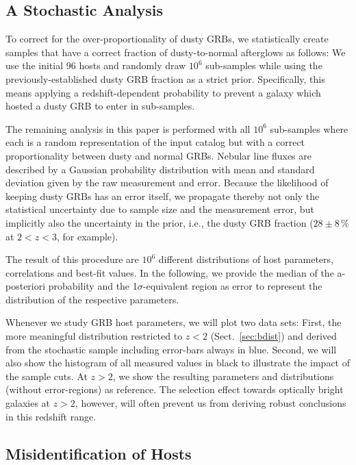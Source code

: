 \documentclass[traditabstract, longauth]{aa}
\begin{document}
\subsection{A Stochastic Analysis}
\label{sec:statana}

 {To correct for the over-proportionality of dusty GRBs, we statistically create samples that have a correct fraction of dusty-to-normal afterglows as follows: We use the initial 96 hosts and randomly draw $10^6$ sub-samples while using the previously-established dusty GRB fraction as a strict prior. Specifically, this means applying a redshift-dependent probability to prevent a galaxy which hosted a dusty GRB to enter in sub-samples.}
 
 {The remaining analysis in this paper is performed with all $10^{6}$ sub-samples where each is a random representation of the input catalog but with a correct proportionality between dusty and normal GRBs. Nebular line fluxes are described by a Gaussian probability distribution with mean and standard deviation given by the raw measurement and error. Because the likelihood of keeping dusty GRBs has an error itself, we propagate thereby not only the statistical uncertainty due to sample size and the measurement error, but implicitly also the uncertainty in the prior, i.e., the dusty GRB fraction ($28\pm8\,\%$ at $2<z<3$, for example).}

 {The result of this procedure are $10^{6}$ different distributions of host parameters, correlations and best-fit values. In the following, we provide the median of the a-posteriori probability and the 1$\sigma$-equivalent region as error to represent the distribution of the respective parameters.}

 {Whenever we study GRB host parameters, we will plot two data sets: First, the more meaningful distribution restricted to $z<2$ (Sect.~\ref{sec:bdist}) and derived from the stochastic sample including error-bars always in blue. Second, we will also show the histogram of all measured values in black to illustrate the impact of the sample cuts. At $z>2$, we show the resulting parameters and distributions (without error-regions) as reference. The selection effect towards optically bright galaxies at $z>2$, however, will often prevent us from deriving robust conclusions in this redshift range.}

\subsection{Misidentification of Hosts}
\end{document}
